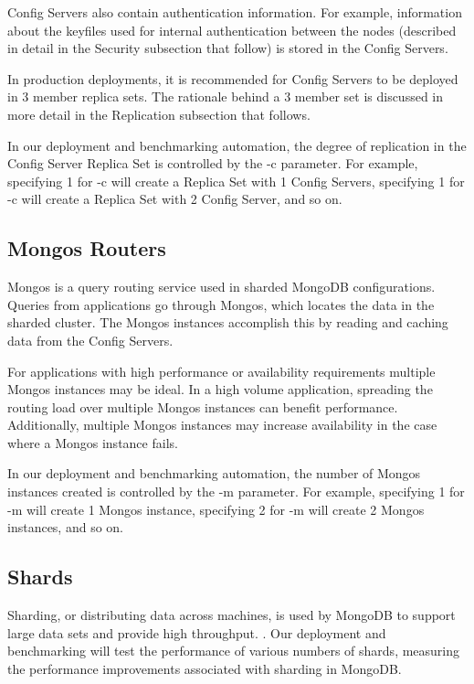 \documentclass[9pt,twocolumn,twoside]{../../styles/osajnl}
\begin{document}
Config Servers also contain authentication information.  For example, information about the keyfiles used for internal authentication between the nodes (described in detail in the Security subsection that follow) is stored in the Config Servers. \cite{www-mongoConfig}

In production deployments, it is recommended for Config Servers to be deployed in 3 member replica sets. \cite{www-mongoComponents}  The rationale behind a 3 member set is discussed in more detail in the Replication subsection that follows.

In our deployment and benchmarking automation, the degree of replication in the Config Server Replica Set is controlled by the -c parameter.  For example, specifying 1 for -c will create a Replica Set with 1 Config Servers, specifying 1 for -c will create a Replica Set with 2 Config Server, and so on. 

\subsection{Mongos Routers}

Mongos is a query routing service used in sharded MongoDB configurations.  Queries from applications go through Mongos, which locates the data in the sharded cluster. The Mongos instances accomplish this by reading and caching data from the Config Servers. \cite{www-mongoMongos} 

For applications with high performance or availability requirements multiple Mongos instances may be ideal.  In a high volume application, spreading the routing load over multiple Mongos instances can benefit performance.  Additionally, multiple Mongos instances may increase availability in the case where a Mongos instance fails. \cite{www-mongoConfig}

In our deployment and benchmarking automation, the number of Mongos instances created is controlled by the -m parameter.  For example, specifying 1 for -m will create 1 Mongos instance, specifying 2 for -m will create 2 Mongos instances, and so on. 


\subsection{Shards}

Sharding, or distributing data across machines, is used by MongoDB to support large data sets and provide high throughput. \cite{www-sharding}.  Our deployment and benchmarking will test the performance of various numbers of shards, measuring the performance improvements associated with sharding in MongoDB.
\end{document}
